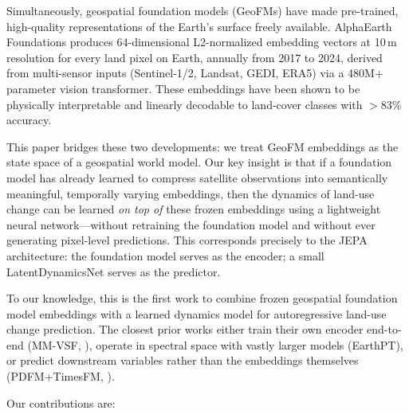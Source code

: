 \documentclass{article}
\begin{document}
Simultaneously, geospatial foundation models (GeoFMs) have made pre-trained, high-quality representations of the Earth's surface freely available. AlphaEarth Foundations \citep{brown2025alphaearth} produces 64-dimensional L2-normalized embedding vectors at 10\,m resolution for every land pixel on Earth, annually from 2017 to 2024, derived from multi-sensor inputs (Sentinel-1/2, Landsat, GEDI, ERA5) via a 480M+ parameter vision transformer. These embeddings have been shown to be physically interpretable \citep{rahman2026interpretable} and linearly decodable to land-cover classes with $>$83\% accuracy.

This paper bridges these two developments: we treat GeoFM embeddings as the state space of a geospatial world model. Our key insight is that if a foundation model has already learned to compress satellite observations into semantically meaningful, temporally varying embeddings, then the dynamics of land-use change can be learned \textit{on top of} these frozen embeddings using a lightweight neural network---without retraining the foundation model and without ever generating pixel-level predictions. This corresponds precisely to the JEPA architecture: the foundation model serves as the encoder; a small LatentDynamicsNet serves as the predictor.

To our knowledge, this is the first work to combine frozen geospatial foundation model embeddings with a learned dynamics model for autoregressive land-use change prediction. The closest prior works either train their own encoder end-to-end (MM-VSF, \citealt{mmvsf2024}), operate in spectral space with vastly larger models (EarthPT), or predict downstream variables rather than the embeddings themselves (PDFM+TimesFM, \citealt{google2024pdfm}).

Our contributions are:
\end{document}
